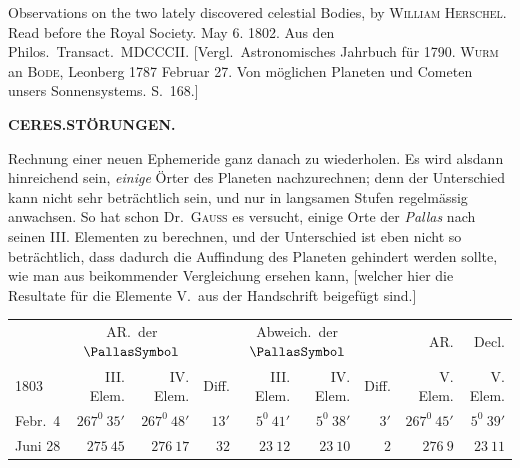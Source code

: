 \par\clearpage
\endgroup
\expandafter\def\csname HistoricalNoteText22\endcsname{Observations on the two lately discovered celestial Bodies, by \textsc{William Herschel}. Read before the Royal Society. May 6. 1802. Aus den Philos.\ Transact.\ MDCCCII.}
\expandafter\def\csname HistoricalNoteText23\endcsname{[Vergl.\ Astronomisches Jahrbuch für 1790. \textsc{Wurm} an \textsc{Bode}, Leonberg 1787 Februar 27. Von möglichen Planeten und Cometen unsers Sonnensystems. S.\ 168.]}
\newcommand{\MercurySymbol}{\text{\mdseries\AstroSymbols ☿}}
\begingroup
\pagestyle{empty}
\newcommand{\GaussVICitation}[2]{%
  \begin{center}
  \parbox{#1\linewidth}{%
    \centering\footnotesize\frenchspacing
    \hrule height .3pt\relax\vspace{2.5pt}
    #2\par
    \vspace{2.5pt}\hrule height .3pt\relax
  }%
  \end{center}
  \par\nobreak\medskip
}
\newcommand{\GaussVIGathering}[2]{%
  \fancypagestyle{gaussVIGathering}{%
    \fancyhf{}%
    \renewcommand{\headrulewidth}{0pt}%
    \renewcommand{\footrulewidth}{0pt}%
    \fancyfoot[C]{\makebox[\textwidth][l]{%
      \hspace*{.025\textwidth}{\footnotesize\bfseries #1}\hfill
      {\normalsize\bfseries\textls[90]{#2}}\hspace*{.18\textwidth}}}%
  }%
  \thispagestyle{gaussVIGathering}%
}
\thispagestyle{empty}
\noindent{}%
\makebox[12mm][l]{}%
\parbox[t]{\dimexpr\linewidth-24mm\relax}{\centering\footnotesize\bfseries CERES.\enspace STÖRUNGEN.\par}%
\par\nobreak\medskip
\noindent Rechnung einer neuen Ephemeride ganz danach zu wiederholen. Es wird alsdann hinreichend sein, \textit{einige} Örter des Planeten nachzurechnen; denn der Unterschied kann nicht sehr beträchtlich sein, und nur in langsamen Stufen regelmässig anwachsen. So hat schon Dr.\ \textsc{Gauss} es versucht, einige Orte der \textit{Pallas} nach seinen III. Elementen zu berechnen, und der Unterschied ist eben nicht so beträchtlich, dass dadurch die Auffindung des Planeten gehindert werden sollte, wie man aus beikommender Vergleichung ersehen kann, [welcher hier die Resultate für die Elemente V.\ aus der Handschrift beigefügt sind.]
\begin{center}
\begingroup\small\setlength{\tabcolsep}{2.5pt}
\begin{tabular}{l|r|r|r|r|r|r|r|r}
&\multicolumn{2}{c|}{AR.\ der $\PallasSymbol$}&&\multicolumn{2}{c|}{Abweich.\ der $\PallasSymbol$}&&AR.&Decl.\\
1803&III. Elem.&IV. Elem.&Diff.&III. Elem.&IV. Elem.&Diff.&V. Elem.&V. Elem.\\\hline
Febr.\ 4&$267^0\ 35'$&$267^0\ 48'$&$13'$&$5^0\ 41'$&$5^0\ 38'$&$3'$&$267^0\ 45'$&$5^0\ 39'$\\
Juni 28&$275\ 45$&$276\ 17$&$32$&$23\ 12$&$23\ 10$&$2$&$276\ 9$&$23\ 11$
\end{tabular}\endgroup
\end{center}
